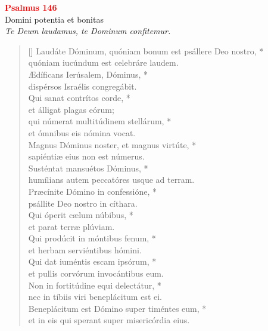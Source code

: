 


\def\greinitialformat#1{%
{\fontsize{39}{39}\selectfont #1}%
}




\vspace{0.3cm}
\begin{center}
 \textcolor{red}{\large \bf Psalmus 146}\\
Domini potentia et bonitas\\
\textit{\small Te Deum laudamus, te Dominum confitemur.}
\end{center}
\begin{verse}[\versewidth]
Laudáte Dóminum, \verselinebreak quóniam bonum est psállere Deo nostro, *\\
quóniam iucúndum est celebráre laudem.\\
\vin Ædíficans Ierúsalem, Dóminus, *\\
\vin dispérsos Israélis congregábit.\\
Qui sanat contrítos corde, *\\
et álligat plagas eórum;\\
\vin qui númerat multitúdinem stellárum, *\\
\vin et ómnibus eis nómina vocat.\\
Magnus Dóminus noster, et magnus virtúte, *\\
sapiéntiæ eius non est númerus.\\
\vin Susténtat mansuétos Dóminus, *\\
\vin humílians autem peccatóres usque ad terram.\\
Præcínite Dómino in confessióne, *\\
psállite Deo nostro in cíthara.\\
\vin Qui óperit cælum núbibus, *\\
\vin et parat terræ plúviam.\\
Qui prodúcit in móntibus fenum, *\\
et herbam serviéntibus hómini.\\
\vin Qui dat iuméntis escam ipsórum, *\\
\vin et pullis corvórum invocántibus eum.\\
Non in fortitúdine equi delectátur, *\\
nec in tíbiis viri beneplácitum est ei.\\
\vin Beneplácitum est Dómino super timéntes eum, *\\
\vin et in eis qui sperant super misericórdia eius.\\
\end{verse}
\vspace{1cm}


